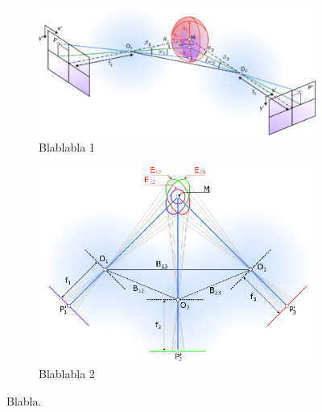 \documentclass[5p,times,procedia]{elsarticle}
\begin{document}
\begin{figure}
	\centering
	\begin{subfigure}[b]{0.55\textwidth}
		\includegraphics[width=0.8\linewidth]{graphics/StereoscopyError.eps}
		\caption{Blablabla 1}
		\label{fig:Ng1} 
	\end{subfigure}
	\begin{subfigure}[b]{0.55\textwidth}
		\includegraphics[width=0.8\linewidth]{graphics/MixedErrorCuttingGeometry.eps}
		\caption{Blablabla 2}
		\label{fig:Ng2}
	\end{subfigure}
	\caption{Blabla.}
\end{figure}
\end{document}
